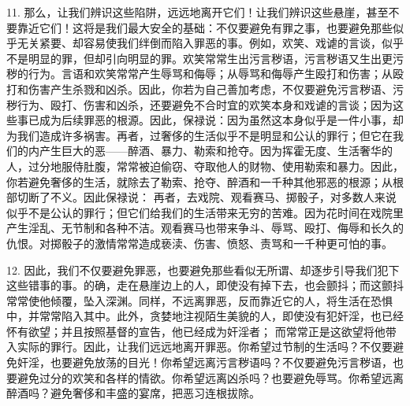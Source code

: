 11. 那么，让我们辨识这些陷阱，远远地离开它们！让我们辨识这些悬崖，甚至不要靠近它们！这将是我们最大安全的基础：不仅要避免有罪之事，也要避免那些似乎无关紧要、却容易使我们绊倒而陷入罪恶的事。例如，欢笑、戏谑的言谈，似乎不是明显的罪，但却引向明显的罪。欢笑常常生出污言秽语，污言秽语又生出更污秽的行为。言语和欢笑常常产生辱骂和侮辱；从辱骂和侮辱产生殴打和伤害；从殴打和伤害产生杀戮和凶杀。因此，你若为自己善加考虑，不仅要避免污言秽语、污秽行为、殴打、伤害和凶杀，还要避免不合时宜的欢笑本身和戏谑的言谈；因为这些事已成为后续罪恶的根源。因此，保禄说：因为虽然这本身似乎是一件小事，却为我们造成许多祸害。再者，过奢侈的生活似乎不是明显和公认的罪行；但它在我们的内产生巨大的恶——醉酒、暴力、勒索和抢夺。因为挥霍无度、生活奢华的人，过分地服侍肚腹，常常被迫偷窃、夺取他人的财物、使用勒索和暴力。因此，你若避免奢侈的生活，就除去了勒索、抢夺、醉酒和一千种其他邪恶的根源；从根部切断了不义。因此保禄说： 再者，去戏院、观看赛马、掷骰子，对多数人来说似乎不是公认的罪行；但它们给我们的生活带来无穷的苦难。因为花时间在戏院里产生淫乱、无节制和各种不洁。观看赛马也带来争斗、辱骂、殴打、侮辱和长久的仇恨。对掷骰子的激情常常造成亵渎、伤害、愤怒、责骂和一千种更可怕的事。\par

12. 因此，我们不仅要避免罪恶，也要避免那些看似无所谓、却逐步引导我们犯下这些错事的事。的确，走在悬崖边上的人，即使没有掉下去，也会颤抖；而这颤抖常常使他倾覆，坠入深渊。同样，不远离罪恶，反而靠近它的人，将生活在恐惧中，并常常陷入其中。此外，贪婪地注视陌生美貌的人，即使没有犯奸淫，也已经怀有欲望；并且按照基督的宣告，他已经成为奸淫者； 而常常正是这欲望将他带入实际的罪行。因此，让我们远远地离开罪恶。你希望过节制的生活吗？不仅要避免奸淫，也要避免放荡的目光！你希望远离污言秽语吗？不仅要避免污言秽语，也要避免过分的欢笑和各样的情欲。你希望远离凶杀吗？也要避免辱骂。你希望远离醉酒吗？避免奢侈和丰盛的宴席，把恶习连根拔除。\par

